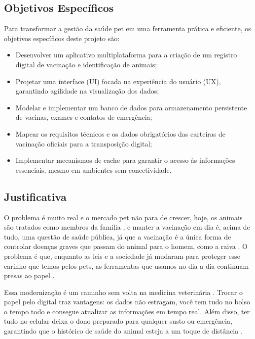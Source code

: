 \documentclass{UNESC}
\begin{document}
\subsection{Objetivos Específicos}

Para transformar a gestão da saúde pet em uma ferramenta prática e eficiente, os objetivos específicos deste projeto são:
\begin{itemize}
    \item Desenvolver um aplicativo multiplataforma para a criação de um registro digital de vacinação e identificação de animais;
    \item Projetar uma interface (UI) focada na experiência do usuário (UX), garantindo agilidade na visualização dos dados;
    \item Modelar e implementar um banco de dados para armazenamento persistente de vacinas, exames e contatos de emergência;
    \item Mapear os requisitos técnicos e os dados obrigatórios das carteiras de vacinação oficiais para a transposição digital;
    \item Implementar mecanismos de cache para garantir o acesso às informações essenciais, mesmo em ambientes sem conectividade.
\end{itemize}

\subsection{Justificativa}

O problema é muito real e o mercado pet não para de crescer, hoje, os animais são tratados como membros da família \cite{BOLSON2022}, e manter a vacinação em dia é, acima de tudo, uma questão de saúde pública, já que a vacinação é a única forma de controlar doenças graves que passam do animal para o homem, como a raiva \cite{MOUTINHO2017}. O problema é que, enquanto as leis e a sociedade já mudaram para proteger esse carinho que temos pelos pets, as ferramentas que usamos no dia a dia continuam presas ao papel \cite{MARTINS2024}.

Essa modernização é um caminho sem volta na medicina veterinária \cite{MORAES2024}. Trocar o papel pelo digital traz vantagens: os dados não estragam, você tem tudo no bolso o tempo todo e consegue atualizar as informações em tempo real. Além disso, ter tudo no celular deixa o dono preparado para qualquer susto ou emergência, garantindo que o histórico de saúde do animal esteja a um toque de distância \cite{RODRIGUES2022}.
\end{document}
